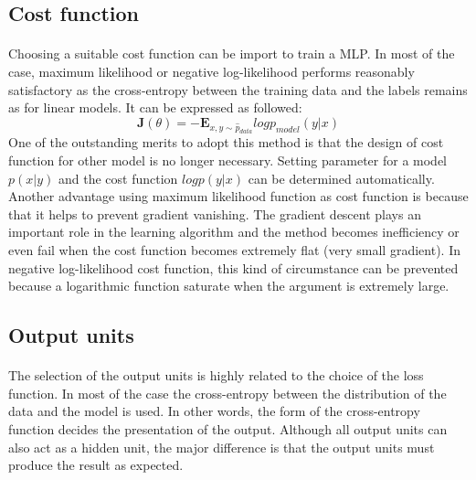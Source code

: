 \subsection{Cost function}
\paragraph{}
Choosing a suitable cost function can be import to train a MLP.
In most of the case, maximum likelihood or negative log-likelihood performs reasonably satisfactory as the cross-entropy between the training data and the labels remains as for linear models.
It can be expressed as followed:
\begin{equation}
    \mathbf{J}(\theta) = -\mathbf{E}_{x,y\sim \hat{p}_{data}}  log   p_{model} (y|x)
    \label{lr_eq:ml_MLE}
\end{equation}
One of the outstanding merits to adopt this method is that the design of cost function for other model is no longer necessary.
Setting parameter for a model $p(x|y)$ and the cost function $log p(y|x)$ can be determined automatically.
Another advantage using maximum likelihood function as cost function is because that it helps to prevent gradient vanishing.
The gradient descent plays an important role in the learning algorithm and the method becomes inefficiency or even fail when the cost function becomes extremely flat (very small gradient).
In negative log-likelihood cost function, this kind of circumstance can be prevented because a logarithmic function saturate when the argument is extremely large.

\subsection{Output units}
\paragraph{}
The selection of the output units is highly related to the choice of the loss function.
In most of the case the cross-entropy between the distribution of the data and the model is used.
In other words, the form of the cross-entropy function decides the presentation of the output.
Although all output units can also act as a hidden unit, the major difference is that the output units must produce the result as expected.

